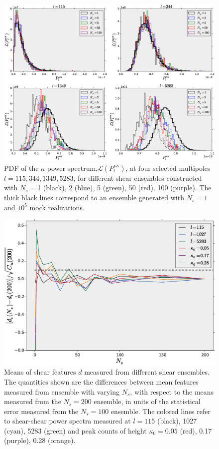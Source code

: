 \documentclass[reprint,aps,prd,superscriptaddress,showkeys,showpacs]{revtex4-1}
\begin{document}
\begin{figure}
\includegraphics[scale=0.4]{Figures/ps_pdf.eps}
\caption{PDF of the $\kappa$ power spectrum,$\mathcal{L}(P_l^{\kappa\kappa})$, at four selected multipoles $l=115,344,1349,5283$, for different shear ensembles constructed with $N_s=$1 (black), 2 (blue), 5 (green), 50 (red), 100 (purple). The thick black lines correspond to an ensemble generated with $N_s=1$ and $10^5$ mock realizations.}
\label{ps_pdf}
\end{figure}

\begin{figure}
\includegraphics[scale=0.3]{Figures/means_ns.eps}
\caption{Means of shear features $d$ measured from different shear ensembles. The quantities shown are the differences between mean features measured from ensemble with varying $N_s$, with respect to the means measured from the $N_s=200$ ensemble, in units of the statistical error measured from the $N_s=100$ ensemble. The colored lines refer to shear-shear power spectra measured at $l=115$ (black), 1027 (cyan), 5283 (green) and peak counts of height $\kappa_0=0.05$ (red), 0.17 (purple), 0.28 (orange).}
\label{means_ns}
\end{figure}
\end{document}
